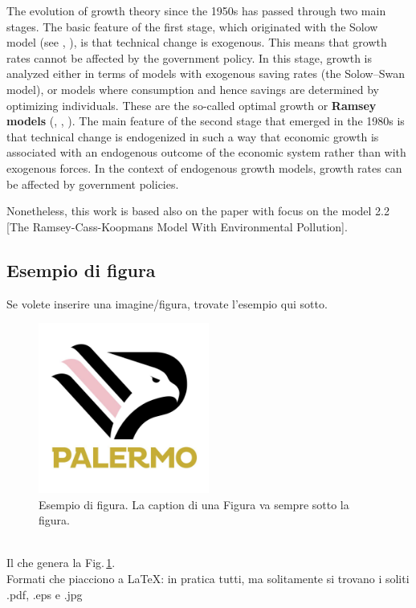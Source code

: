 The evolution of growth theory since the 1950s has passed through two main stages. The basic feature of the first stage, which originated with the Solow model (see \cite[Solow]{solow_contribution_1956}, \cite[Swan]{swan_economic_1956}), is that technical change is exogenous. This means that growth rates cannot be affected by the government policy. In this stage, growth is analyzed either in terms of models with exogenous saving rates (the Solow–Swan model), or models where consumption and hence savings are determined by optimizing individuals. These are the so-called optimal growth or \textbf{Ramsey models} (\cite[Ramsey]{ramsey_mathematical_1928}, \cite[Cass]{cass_optimum_1965}, \cite[Koopmans]{koopmans_concept_1963}). The main feature of the second stage that emerged in the 1980s is that technical change is endogenized in such a way that economic growth is associated with an endogenous
outcome of the economic system rather than with exogenous forces. In the context of endogenous growth models, growth rates can be affected by government policies.


Nonetheless, this work is based also on the paper \cite{caravaggio_nonlinear_2018} with focus on the model 2.2 [The Ramsey-Cass-Koopmans Model With Environmental Pollution]. 

\subsection{Esempio di figura}\label{subsec:esempio_figura}
Se volete inserire una imagine/figura, trovate l'esempio qui sotto.
\begin{figure}[h]
    \centering
    \includegraphics[width=0.5\textwidth]{Figure/esempio.jpg}
    \caption{Esempio di figura. La caption di una Figura va sempre sotto la figura.}
    \label{fig:esempio_fig}
\end{figure}\\
Il che genera la Fig.\,\ref{fig:esempio_fig}.\\
Formati che piacciono a LaTeX: in pratica tutti, ma solitamente si trovano i soliti .pdf, .eps e .jpg
\cite[Chap 12]{Liptser-S-77}

